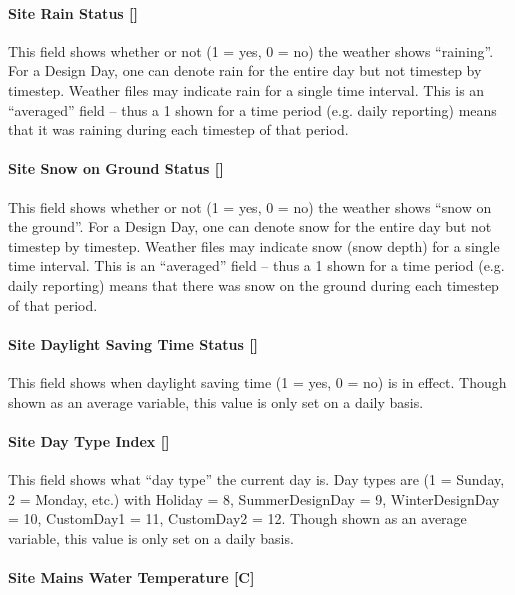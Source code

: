 \paragraph{Site Rain Status {[]}}\label{site-rain-status}

This field shows whether or not (1 = yes, 0 = no) the weather shows ``raining''. For a Design Day, one can denote rain for the entire day but not timestep by timestep. Weather files may indicate rain for a single time interval. This is an ``averaged'' field -- thus a 1 shown for a time period (e.g. daily reporting) means that it was raining during each timestep of that period.

\paragraph{Site Snow on Ground Status {[]}}\label{site-snow-on-ground-status}

This field shows whether or not (1 = yes, 0 = no) the weather shows ``snow on the ground''. For a Design Day, one can denote snow for the entire day but not timestep by timestep. Weather files may indicate snow (snow depth) for a single time interval. This is an ``averaged'' field -- thus a 1 shown for a time period (e.g. daily reporting) means that there was snow on the ground during each timestep of that period.

\paragraph{Site Daylight Saving Time Status {[]}}\label{site-daylight-saving-time-status}

This field shows when daylight saving time (1 = yes, 0 = no) is in effect. Though shown as an average variable, this value is only set on a daily basis.

\paragraph{Site Day Type Index {[]}}\label{site-day-type-index}

This field shows what ``day type'' the current day is. Day types are (1 = Sunday, 2 = Monday, etc.) with Holiday = 8, SummerDesignDay = 9, WinterDesignDay = 10, CustomDay1 = 11, CustomDay2 = 12. Though shown as an average variable, this value is only set on a daily basis.

\paragraph{Site Mains Water Temperature {[}C{]}}\label{site-mains-water-temperature-c}

